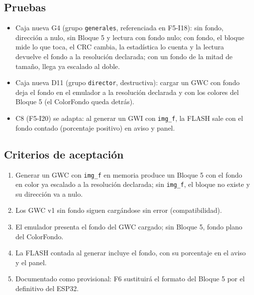 \subsection{Pruebas}
\label{sec:F5I22Pruebas}

\begin{itemize}
	\item Caja nueva G4 (grupo \texttt{generales}, referenciada en F5-I18): sin fondo, dirección a nulo, sin Bloque 5 y lectura con fondo nulo; con fondo, el bloque mide lo que toca, el CRC cambia, la estadística lo cuenta y la lectura devuelve el fondo a la resolución declarada; con un fondo de la mitad de tamaño, llega ya escalado al doble.
	\item Caja nueva D11 (grupo \texttt{director}, destructiva): cargar un GWC con fondo deja el fondo en el emulador a la resolución declarada y con los colores del Bloque 5 (el ColorFondo queda detrás).
	\item C8 (F5-I20) se adapta: al generar un GWI con \texttt{img\_f}, la FLASH sale con el fondo contado (porcentaje positivo) en aviso y panel.
\end{itemize}

\subsection{Criterios de aceptación}
\label{sec:F5I22Criterios}

\begin{enumerate}
	\item Generar un GWC con \texttt{img\_f} en memoria produce un Bloque 5 con el fondo en color ya escalado a la resolución declarada; sin \texttt{img\_f}, el bloque no existe y su dirección va a nulo.
	\item Los GWC v1 sin fondo siguen cargándose sin error (compatibilidad).
	\item El emulador presenta el fondo del GWC cargado; sin Bloque 5, fondo plano del ColorFondo.
	\item La FLASH contada al generar incluye el fondo, con su porcentaje en el aviso y el panel.
	\item Documentado como provisional: F6 sustituirá el formato del Bloque 5 por el definitivo del ESP32.
\end{enumerate}